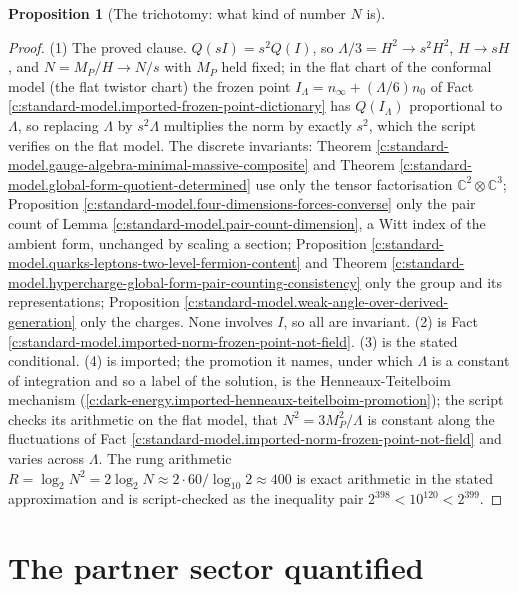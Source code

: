 \documentclass[11pt]{article}
\newtheorem{proposition}[theorem]{Proposition}
\theoremstyle{definition}
\theoremstyle{plain}
\providecommand{\C}{}\renewcommand{\C}{\mathbb{C}}
\begin{document}
\begin{proposition}[The trichotomy: what kind of number $N$ is]
\end{proposition}
\begin{proof}
(1) The proved clause. $Q(sI) = s^{2}Q(I)$, so $\Lambda/3 = H^{2} \to s^{2}H^{2}$, $H \to sH$, and $N = M_{P}/H \to N/s$ with $M_{P}$ held fixed; in the flat chart of the conformal model (the flat twistor chart) the frozen point $I_{\Lambda} = n_{\infty} + (\Lambda/6)n_{0}$ of Fact \ref{c:standard-model.imported-frozen-point-dictionary} has $Q(I_{\Lambda})$ proportional to $\Lambda$, so replacing $\Lambda$ by $s^{2}\Lambda$ multiplies the norm by exactly $s^{2}$, which the script verifies on the flat model. The discrete invariants: Theorem \ref{c:standard-model.gauge-algebra-minimal-massive-composite} and Theorem \ref{c:standard-model.global-form-quotient-determined} use only the tensor factorisation $\C^{2} \otimes \C^{3}$; Proposition \ref{c:standard-model.four-dimensions-forces-converse} only the pair count of Lemma \ref{c:standard-model.pair-count-dimension}, a Witt index of the ambient form, unchanged by scaling a section; Proposition \ref{c:standard-model.quarks-leptons-two-level-fermion-content} and Theorem \ref{c:standard-model.hypercharge-global-form-pair-counting-consistency} only the group and its representations; Proposition \ref{c:standard-model.weak-angle-over-derived-generation} only the charges. None involves $I$, so all are invariant. (2) is Fact \ref{c:standard-model.imported-norm-frozen-point-not-field}. (3) is the stated conditional. (4) is imported; the promotion it names, under which $\Lambda$ is a constant of integration and so a label of the solution, is the Henneaux-Teitelboim mechanism (\ref{c:dark-energy.imported-henneaux-teitelboim-promotion}); the script checks its arithmetic on the flat model, that $N^{2} = 3M_{P}^{2}/\Lambda$ is constant along the fluctuations of Fact \ref{c:standard-model.imported-norm-frozen-point-not-field} and varies across $\Lambda$. The rung arithmetic $R = \log_{2}N^{2} = 2\log_{2}N \approx 2 \cdot 60/\log_{10}2 \approx 400$ is exact arithmetic in the stated approximation and is script-checked as the inequality pair $2^{398} < 10^{120} < 2^{399}$.

\end{proof}

\section{The partner sector quantified}
\end{document}
